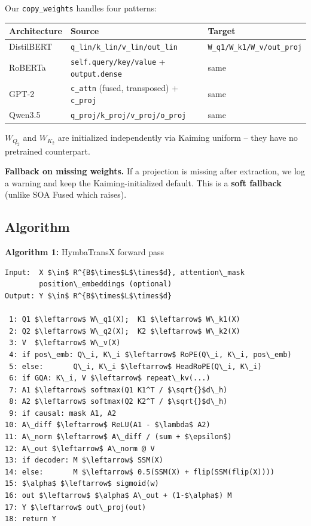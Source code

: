 Our \texttt{copy\_weights} handles four patterns:

\begin{table}[H]
\centering
\small
\begin{tabular}{lll}
\toprule
\textbf{Architecture} & \textbf{Source} & \textbf{Target} \\
\midrule
DistilBERT & \texttt{q\_lin/k\_lin/v\_lin/out\_lin} & \texttt{W\_q1/W\_k1/W\_v/out\_proj} \\
RoBERTa & \texttt{self.query/key/value} + \texttt{output.dense} & same \\
GPT-2 & \texttt{c\_attn} (fused, transposed) + \texttt{c\_proj} & same \\
Qwen3.5 & \texttt{q\_proj/k\_proj/v\_proj/o\_proj} & same \\
\bottomrule
\end{tabular}
\end{table}

$W_{Q_2}$ and $W_{K_2}$ are initialized independently via Kaiming uniform -- 
they have no pretrained counterpart.

\textbf{Fallback on missing weights.} If a projection is missing after extraction, 
we log a warning and keep the Kaiming-initialized default. This is a 
\textbf{soft fallback} (unlike SOA Fused which raises).

\subsection{Algorithm}

\textbf{Algorithm 1:} HymbaTransX forward pass
\begin{lstlisting}
Input:  X $\in$ R^{B$\times$L$\times$d}, attention\_mask
        position\_embeddings (optional)
Output: Y $\in$ R^{B$\times$L$\times$d}

 1: Q1 $\leftarrow$ W\_q1(X);  K1 $\leftarrow$ W\_k1(X)
 2: Q2 $\leftarrow$ W\_q2(X);  K2 $\leftarrow$ W\_k2(X)
 3: V  $\leftarrow$ W\_v(X)
 4: if pos\_emb: Q\_i, K\_i $\leftarrow$ RoPE(Q\_i, K\_i, pos\_emb)
 5: else:       Q\_i, K\_i $\leftarrow$ HeadRoPE(Q\_i, K\_i)
 6: if GQA: K\_i, V $\leftarrow$ repeat\_kv(...)
 7: A1 $\leftarrow$ softmax(Q1 K1^T / $\sqrt{}$d\_h)
 8: A2 $\leftarrow$ softmax(Q2 K2^T / $\sqrt{}$d\_h)
 9: if causal: mask A1, A2
10: A\_diff $\leftarrow$ ReLU(A1 - $\lambda$ A2)
11: A\_norm $\leftarrow$ A\_diff / (sum + $\epsilon$)
12: A\_out $\leftarrow$ A\_norm @ V
13: if decoder: M $\leftarrow$ SSM(X)
14: else:       M $\leftarrow$ 0.5(SSM(X) + flip(SSM(flip(X))))
15: $\alpha$ $\leftarrow$ sigmoid(w)
16: out $\leftarrow$ $\alpha$ A\_out + (1-$\alpha$) M
17: Y $\leftarrow$ out\_proj(out)
18: return Y
\end{lstlisting}

